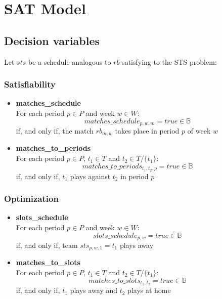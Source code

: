 \section{SAT Model}
\subsection{Decision variables}
Let $sts$ be a schedule analogous to $rb$ satisfying to the STS problem:

\subsubsection{Satisfiability}
\begin{itemize}
    \item \textbf{matches\_schedule}\\
        For each period $p \in P$ and week $w \in W$:
        $$
        matches\_schedule_{p, w, m} = true \in \mathbb{B}
        $$
        if, and only if, the match $rb_{m, w}$ takes place in period $p$ of week $w$
    \item \textbf{matches\_to\_periods}\\
        For each period $p \in P$, $t_1 \in T$ and $t_2 \in T/\{t_1\}$:
        $$
        matches\_to\_periods_{t_1, t_2, p} = true \in \mathbb{B}
        $$
        if, and only if, $t_1$ plays against $t_2$ in period $p$
\end{itemize}
\subsubsection{Optimization}
\begin{itemize}
    \item \textbf{slots\_schedule}\\
        For each period $p \in P$ and week $w \in W$:
        $$
        slots\_schedule_{p, w} = true \in \mathbb{B}
        $$
        if, and only if, team $sts_{p, w, 1} = t_1$ plays away
    \item \textbf{matches\_to\_slots}\\
        For each period $p \in P$, $t_1 \in T$ and $t_2 \in T/\{t_1\}$:
        $$
        matches\_to\_slots_{t_1, t_2} = true \in \mathbb{B}
        $$
        if, and only if, $t_1$ plays away and $t_2$ plays at home
\end{itemize}

